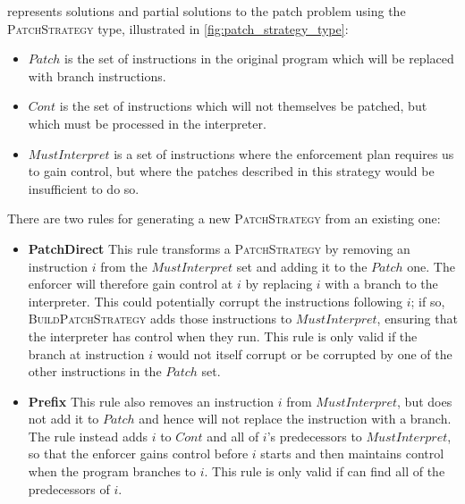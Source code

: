 {\Implementation} represents solutions and partial solutions to the
patch problem using the \textsc{PatchStrategy} type, illustrated in
\autoref{fig:patch_strategy_type}:

\begin{itemize}
\item $\mathit{Patch}$ is the set of instructions in the original
  program which will be replaced with branch instructions.
\item $\mathit{Cont}$ is the set of instructions which will not
  themselves be patched, but which must be processed in the
  interpreter.
\item $\mathit{MustInterpret}$ is a set of instructions where the
  enforcement plan requires us to gain control, but where the patches
  described in this strategy would be insufficient to do so.
\end{itemize}

There are two rules for generating a new \textsc{PatchStrategy} from
an existing one:

\begin{itemize}
\item
  \textbf{PatchDirect} This rule transforms a \textsc{PatchStrategy}
  by removing an instruction $i$ from the $\mathit{MustInterpret}$ set
  and adding it to the $\mathit{Patch}$ one.  The enforcer will
  therefore gain control at $i$ by replacing $i$ with a branch to the
  interpreter.  This could potentially corrupt the instructions
  following $i$; if so, \textsc{BuildPatchStrategy} adds those
  instructions to $\mathit{MustInterpret}$, ensuring that the
  interpreter has control when they run.  This rule is only valid if
  the branch at instruction $i$ would not itself corrupt or be
  corrupted by one of the other instructions in the $\mathit{Patch}$
  set.
\item
  \textbf{Prefix} This rule also removes an instruction $i$ from
  $\mathit{MustInterpret}$, but does not add it to $\mathit{Patch}$
  and hence will not replace the instruction with a branch.  The rule
  instead adds $i$ to $\mathit{Cont}$ and all of $i$'s predecessors to
  $\mathit{MustInterpret}$, so that the enforcer gains control before
  $i$ starts and then maintains control when the program branches to
  $i$.  This rule is only valid if {\technique} can find all of the
  predecessors of $i$.
\end{itemize}

